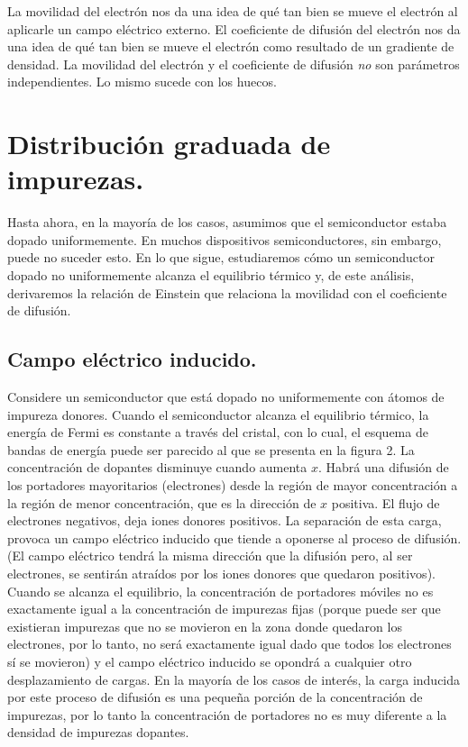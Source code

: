 \documentclass[12pt,a4paper]{article}
\begin{document}
La movilidad del electrón nos da una idea de qué tan bien se mueve el electrón al aplicarle un campo eléctrico externo. El coeficiente de difusión del electrón nos da una idea de qué tan bien se mueve el electrón como resultado de un gradiente de densidad. La movilidad del electrón y el coeficiente de difusión \emph{no} son parámetros independientes. Lo mismo sucede con los huecos.

\section{Distribución graduada de impurezas.}

Hasta ahora, en la mayoría de los casos, asumimos que el semiconductor estaba dopado uniformemente. En muchos dispositivos semiconductores, sin embargo, puede no suceder esto. En lo que sigue, estudiaremos cómo un semiconductor dopado no uniformemente alcanza el equilibrio térmico y, de este análisis, derivaremos la relación de Einstein que relaciona la movilidad con el coeficiente de difusión.

\subsection{Campo eléctrico inducido.}

Considere un semiconductor que está dopado no uniformemente con átomos de impureza donores. Cuando el semiconductor alcanza el equilibrio térmico, la energía de Fermi es constante a través del cristal, con lo cual, el esquema de bandas de energía puede ser parecido al que se presenta en la figura 2. La concentración de dopantes disminuye cuando aumenta $x$. Habrá una difusión de los portadores mayoritarios (electrones) desde la región de mayor concentración a la región de menor concentración, que es la dirección de $x$ positiva. El flujo de electrones negativos, deja iones donores positivos. La separación de esta carga, provoca un campo eléctrico inducido que tiende a oponerse al proceso de difusión. (El campo eléctrico tendrá la misma dirección que la difusión pero, al ser electrones, se sentirán atraídos por los iones donores que quedaron positivos). Cuando se alcanza el equilibrio, la concentración de portadores móviles no es exactamente igual a la concentración de impurezas fijas (porque puede ser que existieran impurezas que no se movieron en la zona donde quedaron los electrones, por lo tanto, no será exactamente igual dado que todos los electrones sí se movieron) y el campo eléctrico inducido se opondrá a cualquier otro desplazamiento de cargas. En la mayoría de los casos de interés, la carga inducida por este proceso de difusión es una pequeña porción de la concentración de impurezas, por lo tanto la concentración de portadores no es muy diferente a la densidad de impurezas dopantes.
\end{document}
